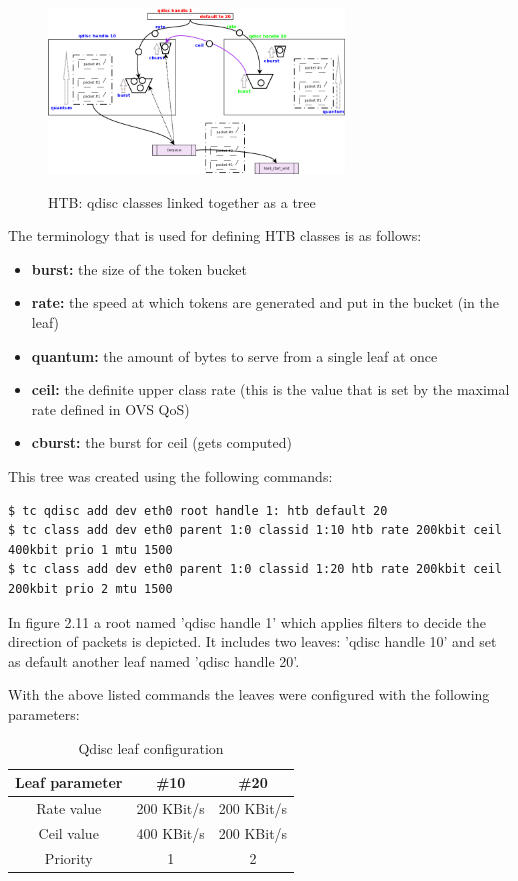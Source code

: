 \begin{figure}[H]
\centering
\includegraphics[width=0.7\textwidth]{images/fundamentals/htb_qdisc.png}
\caption{HTB: qdisc classes linked together as a tree} \cite{htb-qdiscs} 
\end{figure}

The terminology that is used for defining HTB classes is as follows:
\begin{itemize}
\item \textbf{burst:} the size of the token bucket
\item \textbf{rate:} the speed at which tokens are generated and put in the bucket (in the leaf)
\item \textbf{quantum:} the amount of bytes to serve from a single leaf at once
\item \textbf{ceil:} the definite upper class rate (this is the value that is set by the maximal rate defined in OVS QoS)
\item \textbf{cburst:} the burst for ceil (gets computed)
\end{itemize}

This tree was created using the following commands:
\begin{lstlisting}[language=commands]
$ tc qdisc add dev eth0 root handle 1: htb default 20
$ tc class add dev eth0 parent 1:0 classid 1:10 htb rate 200kbit ceil 400kbit prio 1 mtu 1500
$ tc class add dev eth0 parent 1:0 classid 1:20 htb rate 200kbit ceil 200kbit prio 2 mtu 1500
\end{lstlisting}

In figure 2.11 a root named 'qdisc handle 1' which applies filters to decide the direction of packets is depicted. It includes two leaves: 'qdisc handle 10' and set as default another leaf named 'qdisc handle 20'.

With the above listed commands the leaves were configured with the following parameters:

\begin{table}[H]
\centering

\begin{tabular}{|c|c|c|}
\hline Leaf parameter & \#10 & \#20 \\ 
\hline Rate value & 200 KBit/s & 200 KBit/s \\ 
\hline Ceil value & 400 KBit/s & 200 KBit/s \\ 
\hline Priority & 1 & 2 \\ 
\hline 
\end{tabular} 

\caption{Qdisc leaf configuration}
\end{table}

